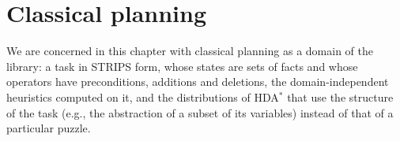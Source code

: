 \chapter{Classical planning}\label{ch:planning}

\begin{center}
\end{center}

We are concerned in this chapter with classical planning as a domain of the
library: a task in STRIPS form, whose states are sets of facts and whose
operators have preconditions, additions and deletions, the domain-independent
heuristics computed on it, and the distributions of HDA$^*$ that use the
structure of the task (e.g., the abstraction of a subset of its variables)
instead of that of a particular puzzle.

